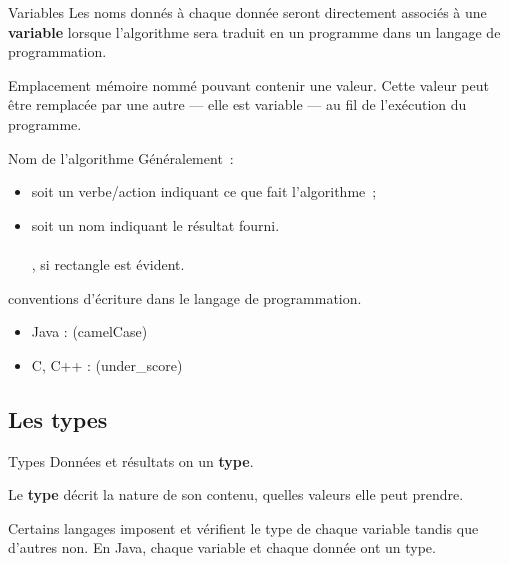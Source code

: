 \begin{hideedit}
\begin{frame}{Variables}
  Les noms donnés à chaque donnée seront directement associés à une
  \textbf{variable} lorsque l'algorithme sera traduit en un programme dans
  un langage de programmation.

  \pause
  \begin{definition}[Variable]
    Emplacement
    mémoire nommé pouvant contenir une valeur. Cette valeur peut être
    remplacée par une autre --- elle est variable --- au fil de l'exécution du
    programme.
  \end{definition}
\end{frame}

\begin{frame}{Nom de l'algorithme}
  Généralement~:
  \begin{itemize}
    \item soit un verbe/action indiquant ce que fait l’algorithme~;\\
      \pause \qquad {}
    \pause
    \item soit un nom indiquant le résultat fourni.\\
      \pause \qquad {}\\
      \pause \qquad {}, si \og rectangle \fg est évident.
  \end{itemize}

  \pause \bcattention conventions d'écriture dans le langage de programmation.
  \begin{itemize}
    \item Java :  (camelCase)
    \item C, C++ :  (under\_score)
  \end{itemize}
\end{frame}

\subsection{Les types}
\begin{frame}{Types}
  Données et résultats on un \textbf{type}.

  Le \textbf{type} décrit la nature de son contenu, quelles valeurs elle
  peut prendre.

  Certains langages imposent et vérifient le type de chaque variable tandis
  que d'autres non. En Java, chaque variable et chaque donnée ont un type.


\end{frame}
\end{hideedit}
